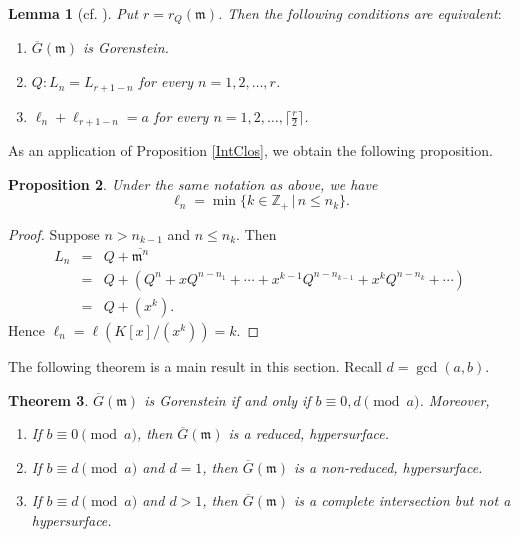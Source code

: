 \documentclass[12pt]{amsart}
\newtheorem{thm}{Theorem}[section]
\newtheorem{lem}[thm]{Lemma}
\newtheorem{prop}[thm]{Proposition}
\theoremstyle{definition}
\theoremstyle{remark}
\numberwithin{equation}{section}
\newcommand{\bbZ}{\ensuremath{\mathbb Z}}
\newcommand{\m}{{\mathfrak m}}
\begin{document}
\begin{lem}[\textrm{cf. \cite[Proposition 2.5]{OWY7}}] \label{MainLem}
Put $r=r_Q(\m)$. Then the following conditions are equivalent$:$
\begin{enumerate}
\item[\rm{(a)}] $\overline{G}(\m)$ is Gorenstein. 
\item[\rm{(b)}] 
$Q \colon L_n=L_{r+1-n}$ for every $n=1,2,\ldots, r$. 
\item[\rm{(c)}]
$\ell_n+\ell_{r+1-n}=a$ for  every $n=1,2,\ldots,\lceil \frac{r}{2} \rceil$. 
\end{enumerate}
\end{lem}

As an application of Proposition \ref{IntClos}, we obtain the following proposition. 


\begin{prop} \label{LNlength}
Under the same notation as above, we have 
\[
\ell_n=\min\{k \in \bbZ_{+} \,|\,  n \le n_k\}.
\] 
\end{prop}

\begin{proof}
Suppose $n > n_{k-1}$ and $n \le n_k$. 
Then 
\begin{eqnarray*}
L_n & =& Q+\overline{\m^n} \\
&=& Q+(Q^n+xQ^{n-n_1}+\cdots + x^{k-1}Q^{n-n_{k-1}} 
+x^kQ^{n-n_k}+\cdots ) \\
&=& Q+(x^k). 
\end{eqnarray*}
Hence $\ell_n=\ell(K[x]/(x^k))=k$. 
\end{proof}

\par \vspace{2mm}
The following theorem is a main result in this section. 
Recall $d=\gcd(a,b)$. 

\begin{thm} \label{Gor-Main}
$\overline{G}(\m)$ is Gorenstein if and only if $b \equiv 0,d \pmod{a}$. Moreover, 
\begin{enumerate}
\item[\rm{(a)}] If $b \equiv 0 \pmod{a}$, 
then $\overline{G}(\m)$ is a reduced, hypersurface. 
\item[\rm{(b)}] If $b \equiv d \pmod{a}$ and $d=1$,  
then $\overline{G}(\m)$ is a non-reduced, hypersurface. 
\item[\rm{(c)}] If $b \equiv d \pmod{a}$ and $d>1$, 
then $\overline{G}(\m)$ is a complete 
intersection but not a hypersurface. 
\end{enumerate}
\end{thm}
\end{document}
